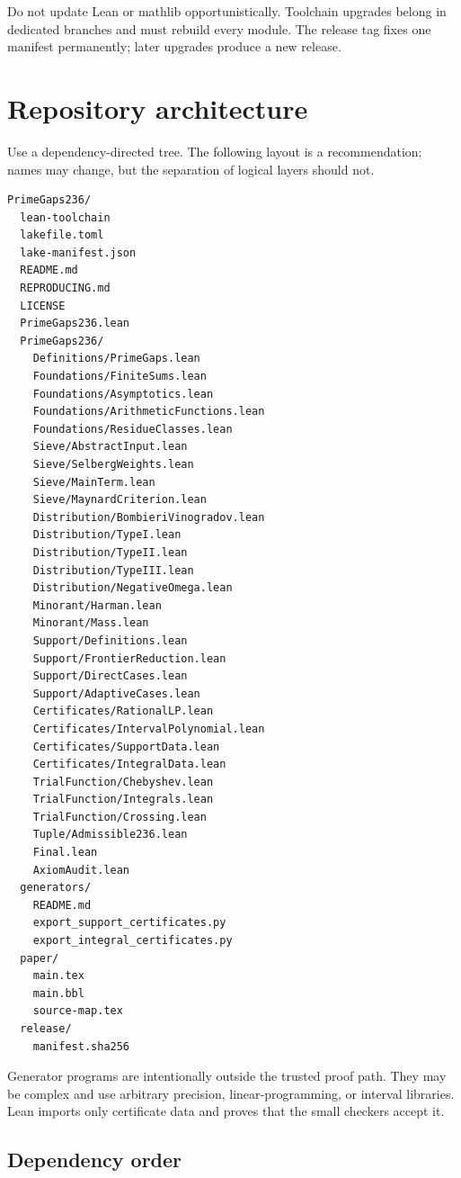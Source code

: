 \documentclass[11pt]{article}
\begin{document}
Do not update Lean or mathlib opportunistically.  Toolchain upgrades belong in
dedicated branches and must rebuild every module.  The release tag fixes one
manifest permanently; later upgrades produce a new release.

\section{Repository architecture}

Use a dependency-directed tree.  The following layout is a recommendation;
names may change, but the separation of logical layers should not.

\begin{lstlisting}[language={}]
PrimeGaps236/
  lean-toolchain
  lakefile.toml
  lake-manifest.json
  README.md
  REPRODUCING.md
  LICENSE
  PrimeGaps236.lean
  PrimeGaps236/
    Definitions/PrimeGaps.lean
    Foundations/FiniteSums.lean
    Foundations/Asymptotics.lean
    Foundations/ArithmeticFunctions.lean
    Foundations/ResidueClasses.lean
    Sieve/AbstractInput.lean
    Sieve/SelbergWeights.lean
    Sieve/MainTerm.lean
    Sieve/MaynardCriterion.lean
    Distribution/BombieriVinogradov.lean
    Distribution/TypeI.lean
    Distribution/TypeII.lean
    Distribution/TypeIII.lean
    Distribution/NegativeOmega.lean
    Minorant/Harman.lean
    Minorant/Mass.lean
    Support/Definitions.lean
    Support/FrontierReduction.lean
    Support/DirectCases.lean
    Support/AdaptiveCases.lean
    Certificates/RationalLP.lean
    Certificates/IntervalPolynomial.lean
    Certificates/SupportData.lean
    Certificates/IntegralData.lean
    TrialFunction/Chebyshev.lean
    TrialFunction/Integrals.lean
    TrialFunction/Crossing.lean
    Tuple/Admissible236.lean
    Final.lean
    AxiomAudit.lean
  generators/
    README.md
    export_support_certificates.py
    export_integral_certificates.py
  paper/
    main.tex
    main.bbl
    source-map.tex
  release/
    manifest.sha256
\end{lstlisting}

Generator programs are intentionally outside the trusted proof path.  They may
be complex and use arbitrary precision, linear-programming, or interval
libraries.  Lean imports only certificate data and proves that the small
checkers accept it.

\subsection{Dependency order}
\end{document}
